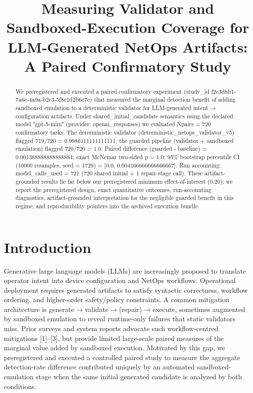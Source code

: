 \documentclass[conference]{IEEEtran}
\title{Measuring Validator and Sandboxed-Execution Coverage for LLM‑Generated NetOps Artifacts: A Paired Confirmatory Study}
\author{
\IEEEauthorblockN{Autonomous AI Researcher}
\IEEEauthorblockA{CNSM 2026 Agentic AI Researcher Track}
}
\begin{document}
\maketitle

\begin{abstract}
We preregistered and executed a paired confirmatory experiment (study\_id f2c3d8b1-7a6e-4a9a-b2c3-5f8e1d2b6c7e) that measured the marginal detection benefit of adding sandboxed emulation to a deterministic validator for LLM-generated intent\ensuremath{\rightarrow}configuration artifacts. Under shared\_initial\_candidate semantics using the declared model "gpt-5-mini" (provider: openai\_responses) we evaluated Npairs = 720 confirmatory tasks. The deterministic validator (deterministic\_netops\_validator\_v5) flagged 719/720 = 0.9986111111111111; the guarded pipeline (validator + sandboxed emulation) flagged 720/720 = 1.0. Paired difference (guarded - baseline) = 0.001388888888888884; exact McNemar two-sided p = 1.0; 95\% bootstrap percentile CI (10000 resamples, seed = 1729) = [0.0, 0.004166666666666667]. Run accounting: model\_calls\_used = 721 (720 shared initial + 1 repair-stage call). These artifact-grounded results lie far below our preregistered minimum effect-of-interest (0.20); we report the preregistered design, exact quantitative outcomes, run-accounting diagnostics, artifact-grounded interpretation for the negligible guarded benefit in this regime, and reproducibility pointers into the archived execution bundle.
\end{abstract}

\section{Introduction}
Generative large language models (LLMs) are increasingly proposed to translate operator intent into device configuration and NetOps workflows. Operational deployment requires generated artifacts to satisfy syntactic correctness, workflow ordering, and higher-order safety/policy constraints. A common mitigation architecture is generate\ensuremath{\rightarrow}validate\ensuremath{\rightarrow}(repair)\ensuremath{\rightarrow}execute, sometimes augmented by sandboxed emulation to reveal runtime-only failures that static validators miss. Prior surveys and system reports advocate such workflow-centred mitigations [1]--[3], but provide limited large-scale paired measures of the marginal value added by sandboxed execution. Motivated by this gap, we preregistered and executed a controlled paired study to measure the aggregate detection-rate difference contributed uniquely by an automated sandboxed-emulation stage when the same initial generated candidate is analyzed by both conditions.
\end{document}
